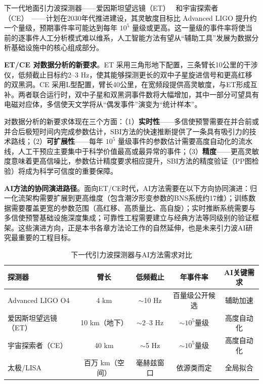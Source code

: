 下一代地面引力波探测器——爱因斯坦望远镜（ET）~\cite{Punturo2010ET} 和宇宙探索者（CE）~\cite{Evans2021CE}——计划在2030年代推进建设，其灵敏度目标比 Advanced LIGO 提升约一个量级，预期事件率可能达到每年 $10^5$ 量级或更高。这一量级的事件率将使当前的逐事件人工分析模式难以维系，人工智能方法有望从“辅助工具”发展为数据分析基础设施中的核心组成部分。

\textbf{ET/CE 对数据分析的新要求}。ET 采用三角形地下配置，三条臂长10公里的干涉仪，低频截止目标约2--3 Hz，使其能够探测更长的双中子星旋进信号和更高红移的双黑洞。CE 采用L型配置，臂长40公里，在宽频段提供高灵敏度，与ET形成互补。两者联合运行时，双中子星和双黑洞事件数将大幅增加，其中一部分可望具有电磁对应体，多信使天文学将从“偶发事件”演变为“统计样本”。

对数据分析的新要求体现在三个方面：（1）\textbf{实时性}——多信使预警需要在并合前或并合后极短时间内完成参数估计，SBI方法的快速推断提供了一条具有吸引力的技术路线；（2）\textbf{可扩展性}——每年 $10^5$ 量级事件的参数估计需要高度自动化的流水线，人工干预应主要集中于科学价值最高或最异常的事件；（3）\textbf{精度}——更高灵敏度意味着更高信噪比，参数估计精度要求相应提升，SBI方法的精度验证（PP图检验）将成为科学可信度的重要保障。

\textbf{AI方法的协同演进路径}。面向ET/CE时代，AI方法需要在以下方向协同演进：归一化流架构需要扩展到更高维度（包含潮汐形变参数的BNS系统约17维）；训练数据需要覆盖更宽的参数范围（高红移、高质量比、高自旋）；实时推断系统需要与多信使预警基础设施深度集成；可靠性工程需要建立与经典方法等同级别的验证框架。这些演进方向，正是本书各章方法论工作的自然延伸，也是未来引力波AI研究最重要的工程目标。

\begin{table}[htbp]
\centering
\caption{下一代引力波探测器与AI方法需求对比}
\label{tab:next_gen_detectors}
\small
\begin{tabular}{lcccc}
\hline
\textbf{探测器} & \textbf{臂长} & \textbf{低频截止} & \textbf{年事件率} & \textbf{AI关键需求} \\
\hline
Advanced LIGO O4 & 4 km & $\sim$10 Hz & 百量级公开候选 & 辅助加速 \\
爱因斯坦望远镜（ET） & 10 km（地下） & $\sim$2--3 Hz & $\sim 10^5$量级 & 高度自动化 \\
宇宙探索者（CE） & 40 km & $\sim$5 Hz & $\sim 10^5$量级 & 高度自动化 \\
太极/LISA & 百万 km（空间） & 毫赫兹窗口 & 依源类而定 & 全局拟合 \\
\hline
\end{tabular}
\end{table}

